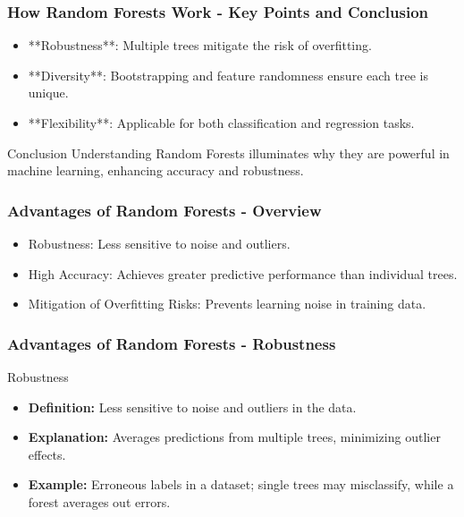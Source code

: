 \documentclass{beamer}
\begin{document}
\begin{frame}[fragile]
    \frametitle{How Random Forests Work - Key Points and Conclusion}
    \begin{itemize}
        \item **Robustness**: Multiple trees mitigate the risk of overfitting.
        \item **Diversity**: Bootstrapping and feature randomness ensure each tree is unique.
        \item **Flexibility**: Applicable for both classification and regression tasks.
    \end{itemize}
    \begin{block}{Conclusion}
        Understanding Random Forests illuminates why they are powerful in machine learning, enhancing accuracy and robustness.
    \end{block}
\end{frame}

\begin{frame}[fragile]
    \frametitle{Advantages of Random Forests - Overview}
    \begin{itemize}
        \item Robustness: Less sensitive to noise and outliers.
        \item High Accuracy: Achieves greater predictive performance than individual trees.
        \item Mitigation of Overfitting Risks: Prevents learning noise in training data.
    \end{itemize}
\end{frame}

\begin{frame}[fragile]
    \frametitle{Advantages of Random Forests - Robustness}
    \begin{block}{Robustness}
        \begin{itemize}
            \item \textbf{Definition:} Less sensitive to noise and outliers in the data.
            \item \textbf{Explanation:} Averages predictions from multiple trees, minimizing outlier effects.
            \item \textbf{Example:} Erroneous labels in a dataset; single trees may misclassify, while a forest averages out errors.
        \end{itemize}
    \end{block}
\end{frame}
\end{document}

